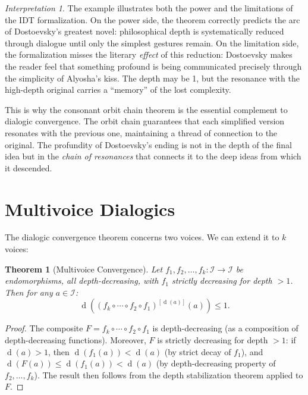 \documentclass[11pt,openany]{book}
\theoremstyle{definition}
\theoremstyle{plain}
\newtheorem{theorem}[axiom]{Theorem}
\theoremstyle{remark}
\newtheorem{interpretation}[axiom]{Interpretation}
\newcommand{\IS}{\mathcal{I}}               %
\newcommand{\depth}{\operatorname{d}}       %
\begin{document}
\begin{interpretation}
The example illustrates both the power and the limitations of the IDT formalization. On the power side, the theorem correctly predicts the arc of Dostoevsky's greatest novel: philosophical depth is systematically reduced through dialogue until only the simplest gestures remain. On the limitation side, the formalization misses the literary \emph{effect} of this reduction: Dostoevsky makes the reader feel that something profound is being communicated precisely through the simplicity of Alyosha's kiss. The depth may be 1, but the resonance with the high-depth original carries a ``memory'' of the lost complexity.

This is why the consonant orbit chain theorem is the essential complement to dialogic convergence. The orbit chain guarantees that each simplified version resonates with the previous one, maintaining a thread of connection to the original. The profundity of Dostoevsky's ending is not in the depth of the final idea but in the \emph{chain of resonances} that connects it to the deep ideas from which it descended.
\end{interpretation}

\section{Multivoice Dialogics}

The dialogic convergence theorem concerns two voices. We can extend it to $k$ voices:

\begin{theorem}[Multivoice Convergence]
Let $f_1, f_2, \ldots, f_k : \IS \to \IS$ be endomorphisms, all depth-decreasing, with $f_1$ strictly decreasing for depth $> 1$. Then for any $a \in \IS$:
\[
\depth((f_k \circ \cdots \circ f_2 \circ f_1)^{[\depth(a)]}(a)) \leq 1.
\]
\end{theorem}

\begin{proof}
The composite $F = f_k \circ \cdots \circ f_2 \circ f_1$ is depth-decreasing (as a composition of depth-decreasing functions). Moreover, $F$ is strictly decreasing for depth $> 1$: if $\depth(a) > 1$, then $\depth(f_1(a)) < \depth(a)$ (by strict decay of $f_1$), and $\depth(F(a)) \leq \depth(f_1(a)) < \depth(a)$ (by depth-decreasing property of $f_2, \ldots, f_k$). The result then follows from the depth stabilization theorem applied to $F$.
\end{proof}
\end{document}
